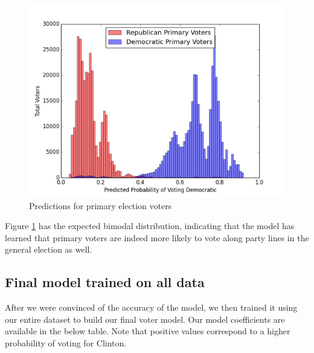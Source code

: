 \documentclass[10pt, letterpaper]{article}
\begin{document}
\begin{multicols}{2}
\begin{figure}[H]
\begin{center}
\includegraphics[scale=0.3]{primaryVoters19}
\end{center}
\caption{Predictions for primary election voters}
\label{fig:primaryVoters19}
\end{figure}

Figure \ref{fig:primaryVoters19} has the expected bimodal distribution, indicating that the model has learned that primary voters are indeed more likely to vote along party lines in the general election as well.

\subsection{Final model trained on all data}

After we were convinced of the accuracy of the model, we then trained it using our entire dataset to build our final voter model. Our model coefficients are available in the below table. Note that positive values correspond to a higher probability of voting for Clinton.


\end{multicols}
\end{document}
